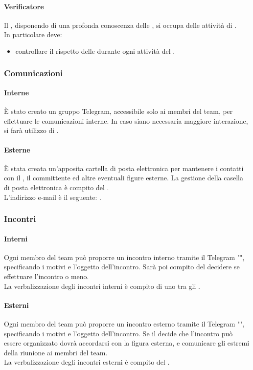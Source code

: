  \paragraph{Verificatore}
 Il \VER , disponendo di una profonda conoscenza delle \NPdoc , si occupa delle attività di . \\
 In particolare deve: 
 \begin{itemize}
  \item controllare il rispetto delle \NPdoc durante ogni attività del .
 \end{itemize} 
\subsubsection{Comunicazioni}
 \paragraph{Interne}
 È stato creato un gruppo Telegram, accessibile solo ai membri del team, per effettuare le comunicazioni interne. In caso siano necessaria maggiore interazione, si farà utilizzo di . 
 \paragraph{Esterne}
 È stata creata un'apposita cartella di posta elettronica per mantenere i contatti con il , il committente ed altre eventuali figure esterne.
 La gestione della casella di posta elettronica è compito del \RESP. \\
 L'indirizzo e-mail è il seguente: \EMAIL.
\subsubsection{Incontri}
 \paragraph{Interni}
 Ogni membro del team può proporre un incontro interno tramite il  Telegram "", specificando i motivi e l'oggetto dell'incontro. 
 Sarà poi compito del \RESP{} decidere se effettuare l'incontro o meno.\\
  La verbalizzazione degli incontri interni è compito di uno tra gli \AMMP.
 \paragraph{Esterni} 
 Ogni membro del team può proporre un incontro esterno tramite il  Telegram "", specificando i motivi e l'oggetto dell'incontro. 
Se il \RESP{} decide che l'incontro può essere organizzato dovrà accordarsi con la figura esterna, e comunicare gli estremi della riunione ai membri del team.\\
 La verbalizzazione degli incontri esterni è compito del \RESP.
